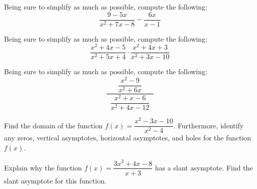 \documentclass[12pt,letterpaper]{exam}
\begin{document}
\begin{questions}
\newpage
\question[10] Being sure to simplify as much as possible, compute the following:
	\[
	\dfrac{9 - 5x}{x^2 + 7x - 8} - \dfrac{6x}{x - 1}
	\]



\newpage
\question[10] Being sure to simplify as much as possible, compute the following:
	\[
	\dfrac{x^2 + 4x - 5}{x^2 + 5x + 4} \cdot \dfrac{x^2 + 4x + 3}{x^2 + 3x - 10}
	\]



\newpage
\question[10] Being sure to simplify as much as possible, compute the following:
	\[
	\dfrac{\;\;\dfrac{x^2 - 9}{x^2 + 6x}\;\;}{\;\;\dfrac{x^2 + x - 6}{x^2 + 4x - 12}\;\;}
	\]



\newpage
\question[10] Find the domain of the function $f(x)= \dfrac{x^2 - 3x - 10}{x^2 - 4}$. Furthermore, identify any zeros, vertical asymptotes, horizontal asymptotes, and holes for the function $f(x)$. 



\newpage
\question[10] Explain why the function $f(x)= \dfrac{3x^2 + 4x - 8}{x + 3}$ has a slant asymptote. Find the slant asymptote for this function. 


\end{questions}
\end{document}
